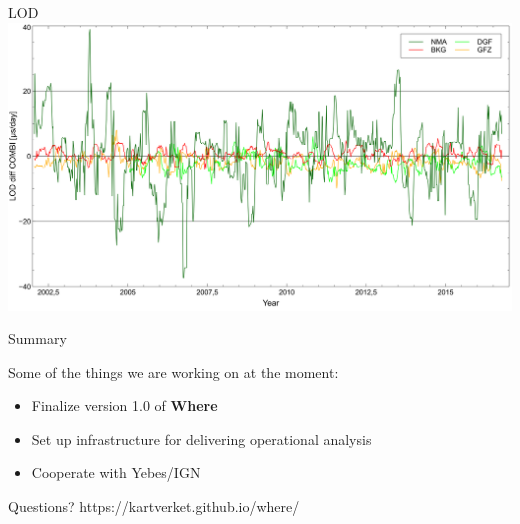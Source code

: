 \documentclass[14pt,c]{beamer}
\begin{document}
\begin{frame}{LOD}
  \includegraphics[width=\linewidth]{figure/lod_nma_diff_combi}
\end{frame}


\begin{frame}{Summary}

  \begin{centering}
    Some of the things we are working on at the moment:
  \end{centering}

  \begin{itemize}
  \item Finalize version 1.0 of \textbf{Where}
  \item Set up infrastructure for delivering operational analysis
  \item Cooperate with Yebes/IGN
  \end{itemize}
\end{frame}

\begin{frame}{Questions?}
  \large{https://kartverket.github.io/where/}
\end{frame}
\end{document}
